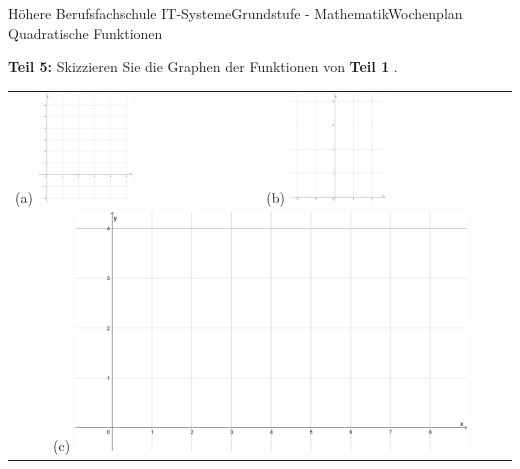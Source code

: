\documentclass[oneside,openany,headings=optiontotoc,11pt,numbers=noenddot]{scrreprt}
\begin{document}
\begin{worksheet}{Höhere Berufsfachschule IT-Systeme}{Grundstufe - Mathematik}{Wochenplan Quadratische Funktionen}
\begin{framed}
			\noindent
			\textbf{Teil 5:} Skizzieren Sie die Graphen der Funktionen von \textbf{Teil 1} .\\
			\begin{tabularx}{\textwidth}{XX}
				(a) \includegraphics[width=0.4\textwidth, align=t]{../99_Bilder/WP7DiA.jpg} & (b) \includegraphics[width=0.4\textwidth, align=t]{../99_Bilder/WP7DiB.jpg}\\
				\multicolumn{2}{c}{(c) \includegraphics[width=0.8\textwidth, align=t]{../99_Bilder/WP7DiC.jpg}}
			\end{tabularx}
		\end{framed}
	\end{worksheet}
\end{document}
